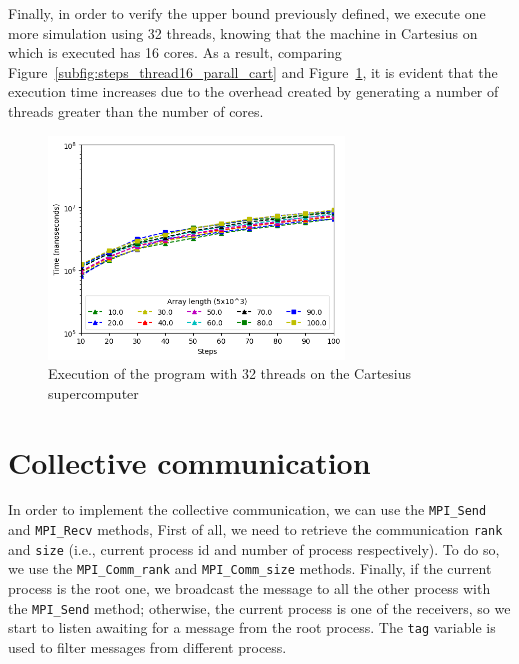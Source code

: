 \documentclass[a4paper]{article}
\begin{document}
Finally, in order to verify the upper bound previously defined, we execute one more simulation using 32 threads, knowing that the machine in Cartesius on which is executed has 16 cores. As a result, comparing Figure~\ref{subfig:steps_thread16_parall_cart} and Figure~\ref{fig:steps_thread32_parall_cart}, it is evident that the execution time increases due to the overhead created by generating a number of threads greater than the number of cores.

\begin{figure}[htbp]
\centering
\includegraphics[width=0.7\textwidth]{res/parallel/array_thread_32_steps_res_cartesius.png}
\caption{Execution of the program with 32 threads on the Cartesius supercomputer}
\label{fig:steps_thread32_parall_cart}
\end{figure}
\newpage

\section{Collective communication}

In order to implement the collective communication, we can use the \texttt{MPI\_Send} and \texttt{MPI\_Recv} methods, First of all, we need to retrieve the communication \texttt{rank} and \texttt{size} (i.e., current process id and number of process respectively). To do so, we use the \texttt{MPI\_Comm\_rank} and \texttt{MPI\_Comm\_size} methods. Finally, if the current process is the root one, we broadcast the message to all the other process with the \texttt{MPI\_Send} method; otherwise, the current process is one of the receivers, so we start to listen awaiting for a message from the root process. The \texttt{tag} variable is used to filter messages from different process.
\end{document}
